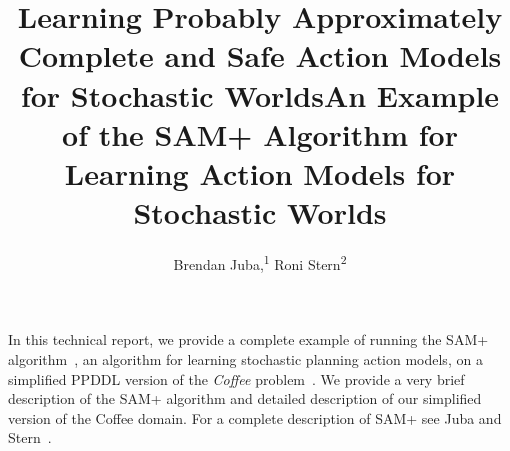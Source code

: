 \documentclass[letterpaper]{article} %
\title{Learning Probably  Approximately Complete and Safe Action Models for Stochastic Worlds}
\title{An Example of the SAM+ Algorithm for Learning Action Models for Stochastic Worlds}
\author {
    Brendan Juba,\equalcontrib\textsuperscript{\rm 1}
    Roni Stern\equalcontrib\textsuperscript{\rm 2}
}
\begin{document}
\maketitle









In this technical report, we provide a complete example of running the SAM+ algorithm~\cite{juba2022learning}, an algorithm for learning stochastic planning action models, on a simplified PPDDL version of the \emph{Coffee} problem~\cite{dearden1997abstraction}. 
We provide a very brief description of the SAM+ algorithm and detailed description of our simplified version of the Coffee domain. 
For a complete description of SAM+ see Juba and Stern~. 
\end{document}
